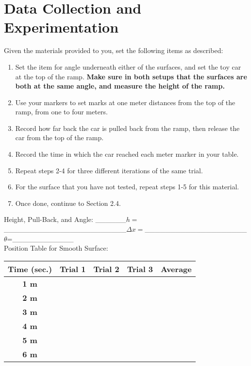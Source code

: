 \documentclass[12pt, letterpaper]{report}
\begin{document}
    \section{Data Collection and Experimentation}
      \par Given the materials provided to you, set the following items as described:
      \begin{enumerate}
        \item{Set the item for angle underneath either of the surfaces, and set the toy car at the top of the ramp. \textbf{Make sure in both setups that the surfaces are both at the same angle, and measure the height of the ramp.}}
        \item{Use your markers to set marks at one meter distances from the top of the ramp, from one to four meters.}
        \item{Record how far back the car is pulled back from the ramp, then release the car from the top of the ramp.}
        \item{Record the time in which the car reached each meter marker in your table.}
        \item{Repeat steps 2-4 for three different iterations of the same trial.}
        \item{For the surface that you have not tested, repeat steps 1-5 for this material.}
        \item{Once done, continue to Section 2.4.} \\
      \end{enumerate}
      Height, Pull-Back, and Angle: \_\_\_\_\_\_$h=$\_\_\_\_\_\_\_\_\_\_\_\_\_\_\_\_\_\_\_\_\_\_\_\_$\Delta x=$\_\_\_\_\_\_\_\_\_\_\_\_\_\_\_\_\_\_\_\_$\theta$=\_\_\_\_\_\_\_\_\_\_\_\_ \\
      Position Table for Smooth Surface:
      \begin{center}
        \begin{tabular}{| c | c | c | c | c |}
          \hline
          \textbf{Time (sec.)} & \textbf{Trial 1} & \textbf{Trial 2} & \textbf{Trial 3} & \textbf{Average} \\
          \hline
          \textbf{1 m} & & & & \\
          \hline
          \textbf{2 m} & & & & \\
          \hline
          \textbf{3 m} & & & & \\
          \hline
          \textbf{4 m} & & & & \\
          \hline
          \textbf{5 m} & & & & \\
          \hline
          \textbf{6 m} & & & & \\
          \hline
        \end{tabular}
      \end{center}
\end{document}
